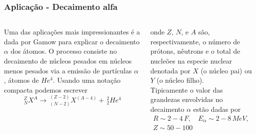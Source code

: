 \documentclass[12pt,brazil,table]{beamer}
\begin{document}
\begin{frame}
  \frametitle{Aplicação - Decaimento alfa}
  \fontsize{9pt}{11pt}\selectfont
  
  \begin{center}
  \end{center}
  
  \begin{columns}
  
    
    Uma das aplicações mais impressionantes é a dada por Gamow para explicar o decaimento $\alpha$ dos átomos. O processo consiste no decaimento de núcleos pesados em núcleos menos pesados via a emissão de partículas $\alpha$, átomos de $He^4$. Usando uma notação compacta podemos escrever 
    \[
     \,^Z_NX^A \longrightarrow \,^{(Z-2)}_{(N-2)}X^{(A-4)}+\,^2_2He^4
    \]
    
    
    onde $Z$, $N$, e $A$ são, respectivamente, o número de prótons, nêutrons e o total de nucleões na especie nuclear denotada por $X$ (o núcleo pai) ou $Y$ (o núcleo filho).\\
    
    Tipicamente o valor das grandezas envolvidas no decaimento $\alpha$ estão dadas por
    \begin{align*}
     R \sim 2-4\,F, & E_\alpha \sim 2-8\,MeV,\\
     Z \sim 50-100 &
    \end{align*}
    
  \end{columns}

\end{frame}


  
\end{document}
